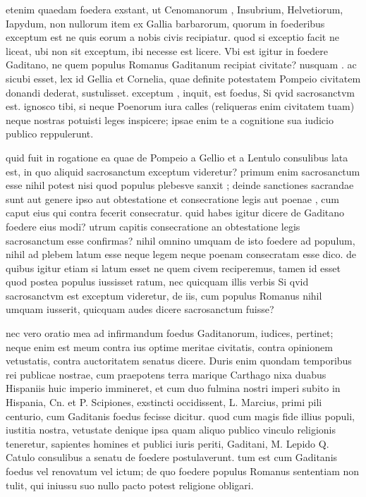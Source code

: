  etenim quaedam foedera exstant, ut Cenomanorum , Insubrium, Helvetiorum, Iapydum, non nullorum item ex Gallia barbarorum, quorum in foederibus exceptum est ne quis eorum a nobis civis recipiatur. quod si exceptio facit ne liceat, ubi non sit exceptum, ibi necesse est licere. Vbi est igitur in foedere Gaditano, ne quem populus Romanus Gaditanum recipiat civitate? nusquam . ac sicubi esset, lex id Gellia et Cornelia, quae definite potestatem Pompeio civitatem donandi dederat, sustulisset. exceptum , inquit, est foedus, Si qvid sacrosanctvm est. ignosco tibi, si neque Poenorum iura calles (reliqueras enim civitatem tuam) neque nostras potuisti leges inspicere; ipsae enim te a cognitione sua iudicio publico reppulerunt.

 quid fuit in rogatione ea quae de Pompeio a Gellio et a Lentulo consulibus lata est, in quo aliquid sacrosanctum exceptum videretur? primum enim sacrosanctum esse nihil potest nisi quod populus plebesve sanxit ; deinde sanctiones sacrandae sunt aut genere ipso aut obtestatione et consecratione legis aut poenae , cum caput eius qui contra fecerit consecratur. quid habes igitur dicere de Gaditano foedere eius modi? utrum capitis consecratione an obtestatione legis sacrosanctum esse confirmas? nihil omnino umquam de isto foedere ad populum, nihil ad plebem latum esse neque legem neque poenam consecratam esse dico. de quibus igitur etiam si latum esset ne quem civem reciperemus, tamen id esset quod postea populus iussisset ratum, nec quicquam illis verbis Si qvid sacrosanctvm est exceptum videretur, de iis, cum populus Romanus nihil umquam iusserit, quicquam audes dicere sacrosanctum fuisse?

 nec vero oratio mea ad infirmandum foedus Gaditanorum, iudices, pertinet; neque enim est meum contra ius optime meritae civitatis, contra opinionem vetustatis, contra auctoritatem senatus dicere. Duris enim quondam temporibus rei publicae nostrae, cum praepotens terra marique Carthago nixa duabus Hispaniis huic imperio immineret, et cum duo fulmina nostri imperi subito in Hispania, Cn. et P. Scipiones, exstincti occidissent, L. Marcius, primi pili centurio, cum Gaditanis foedus fecisse dicitur. quod cum magis fide illius populi, iustitia nostra, vetustate denique ipsa quam aliquo publico vinculo religionis teneretur, sapientes homines et publici iuris periti, Gaditani, M. Lepido Q. Catulo consulibus a senatu de foedere postulaverunt. tum est cum Gaditanis foedus vel renovatum vel ictum; de quo foedere populus Romanus sententiam non tulit, qui iniussu suo nullo pacto potest religione obligari.

